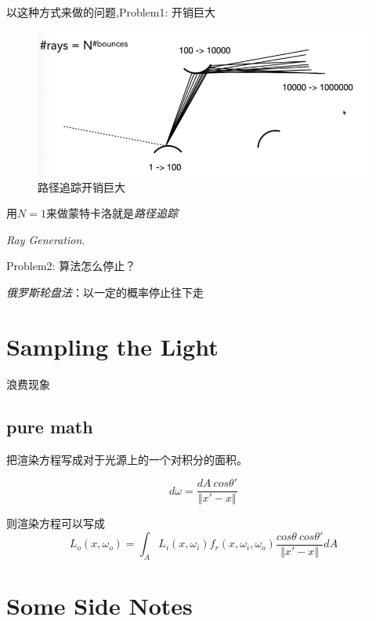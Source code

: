 以这种方式来做的问题,Problem1: 开销巨大
    \begin{figure}[H]
        \centering
        \includegraphics[scale=0.5]{figures/路径追踪开销巨大.png}
        \caption{路径追踪开销巨大}
    \end{figure}

    用$N=1$来做蒙特卡洛就是\textsl{路径追踪}

\textsl{Ray Generation}.

Problem2: 算法怎么停止？

\textsl{俄罗斯轮盘法}：以一定的概率停止往下走

\section{Sampling the Light}

浪费现象

\subsection*{pure math}

把渲染方程写成对于光源上的一个对积分的面积。

\begin{equation}
    d\omega=\frac{dA\ cos\theta'}{\Vert x'-x\Vert}
\end{equation}

则渲染方程可以写成
\begin{equation}
    L_o(x,\omega_o)=\int_AL_i(x,\omega_i)f_r(x,\omega_i,\omega_o)\frac{cos\theta\ cos\theta'}{\Vert x'-x\Vert}dA
\end{equation}

\section{Some Side Notes}